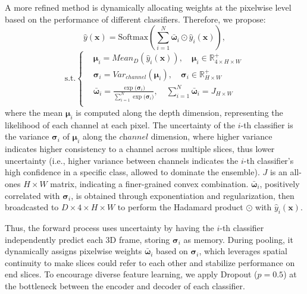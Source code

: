 A more refined method is dynamically allocating weights at the pixelwise level based on the performance of different classifiers. Therefore, we propose:
\begin{equation}
\hat{y}(\textbf{x}) = \text{Softmax}\left(\sum_{\textit{i}=1}^{\textit{N}} \bar{\boldsymbol{\omega}}_{i} \odot \hat{y}_{\textit{i}}(\textbf{x})\right),
\end{equation}
\begin{equation*}
\text{s.t.}\left\{
\begin{aligned}
& \boldsymbol{\mu}_{i} = Mean_{D}(\hat{y}_{\textit{i}}(\textbf{x})), \quad \boldsymbol{\mu}_{i} \in \mathbb{R}^{+}_{4\times H \times W}\\
& \boldsymbol{\sigma}_{i} = Var_{channel}(\boldsymbol{\mu}_{i}), \quad \boldsymbol{\sigma}_{i} \in  \mathbb{R}^{+}_{H \times W}\\
& \bar{\boldsymbol{\omega}}_{i} = \frac{\exp{(\boldsymbol{\sigma}_{i}})}{\sum_{\textit{i}=1}^{\textit{N}}\exp{(\boldsymbol{\sigma}_{i}})}, \quad \sum_{\textit{i}=1}^{\textit{N}}\bar{\boldsymbol{\omega}}_{i} = J_{H \times W}\\
\end{aligned}
\right.
\end{equation*}
where the mean \(\boldsymbol{\mu}_{i}\) is computed along the depth dimension, representing the likelihood of each channel at each pixel. The uncertainty of the \(i\)-th classifier is the variance \(\boldsymbol{\sigma}_{i}\) of \(\boldsymbol{\mu}_{i}\) along the \(\textit{channel}\) dimension, where higher variance indicates higher consistency to a channel across multiple slices, thus lower uncertainty (i.e., higher variance between channels indicates the \(i\)-th classifier's high confidence in a specific class, allowed to dominate the ensemble). \( J \) is an all-ones \( H \times W \) matrix, indicating a finer-grained convex combination. $\bar{\boldsymbol{\omega}}_{i}$, positively correlated with $\boldsymbol{\sigma}_{i}$, is obtained through exponentiation and regularization, then broadcasted to $D \times 4 \times H \times W$ to perform the Hadamard product $\odot$ with $\hat{y}_{i}(\textbf{x})$.

Thus, the forward process uses uncertainty by having the \(i\)-th classifier independently predict each 3D frame, storing \(\boldsymbol{\sigma}_{i}\) as memory. During pooling, it dynamically assigns pixelwise weights $\bar{\boldsymbol{\omega}}_{i}$ based on \(\boldsymbol{\sigma}_{i}\), which leverages spatial continuity to make slices could refer to each other and stabilize performance on end slices. To encourage diverse feature learning, we apply Dropout (\( p = 0.5 \)) at the bottleneck between the encoder and decoder of each classifier.

